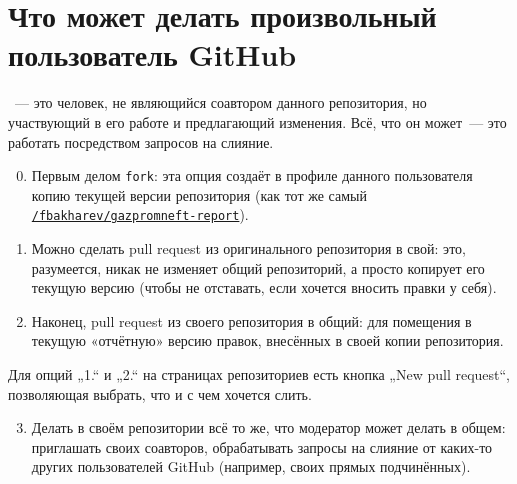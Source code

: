 \documentclass[12pt,a4paper,report]{ncc}
\begin{document}
\section{Что может делать произвольный пользователь GitHub}

~— это человек, не являющийся соавтором данного репозитория, но участвующий в его работе и предлагающий изменения. Всё, что он может~— это работать посредством запросов на слияние.

\begin{enumerate}
\setcounter{enumi}{-1}

\item Первым делом {\tt fork}: эта опция создаёт в профиле данного пользователя копию текущей версии репозитория (как тот же самый {\tt \href{https://github.com/fbakharev/gazpromneft-report}{/fbakharev/gazpromneft-report}}).

\item Можно сделать pull request из оригинального репозитория в свой: это, разумеется, никак не изменяет общий репозиторий, а просто копирует его текущую версию (чтобы не отставать, если хочется вносить правки у себя).

\item Наконец, pull request из своего репозитория в общий: для помещения в текущую «отчётную» версию правок, внесённых в своей копии репозитория.

\end{enumerate}

Для опций „1.“ и „2.“ на страницах репозиториев есть кнопка „New pull request“, позволяющая выбрать, что и с чем хочется слить.

\begin{enumerate}
\setcounter{enumi}{2}

\item Делать в своём репозитории всё то же, что модератор может делать в общем: приглашать своих соавторов, обрабатывать запросы на слияние от каких-то других пользователей GitHub (например, своих прямых подчинённых).

\end{enumerate}
\end{document}
